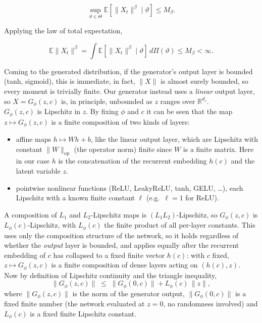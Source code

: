 \begin{appendices}
\[
\sup_{\vartheta\in\Theta}
\mathbb E
\left[
\|X_t\|^\beta
\mid
\vartheta
\right]
\le
M_\beta.
\]

Applying the law of total expectation,

\[
\mathbb E
\|X_t\|^\beta
=
\int
\mathbb E
[
\|X_t\|^\beta
\mid
\vartheta
]
\,d\Pi(\vartheta)
\le
M_\beta
<
\infty.
\]


\vspace{3cm}
Coming to the generated distribution,
if the generator's output layer is bounded (tanh, sigmoid), this is immediate, in fact, $\|X\|$ is almost surely bounded, 
so every moment is trivially finite. 
Our generator instead uses a \emph{linear} output layer, 
so $X=G_\phi(z,c)$ is, in principle, 
unbounded as $z$ ranges over $\mathbb{R}^{d_z}$.\\
$G_\phi(z,c)$ is Lipschitz in $z$. By fixing $\phi$ and $c$ it can be seen that
the map $z\mapsto G_\phi(z,c)$ is a finite composition of two kinds of layers:
\begin{itemize}
\item affine maps $h\mapsto Wh+b$, like the linear output layer,
which are Lipschitz with constant $\|W\|_{\mathrm{op}}$ (the operator norm) finite since $W$ is a finite matrix. Here in our case $h$ is the concatenation of the recurrent embedding $h(c)$ and the latent variable $z$.
\item pointwise nonlinear functions (ReLU, LeakyReLU, tanh, GELU, \ldots), each Lipschitz with a known finite constant $\ell$ (e.g.\ $\ell=1$ for ReLU).
\end{itemize}
A composition of $L_1$ and 
$L_2$-Lipschitz maps is $(L_1L_2)$-Lipschitz, 
so $G_\phi(z,c)$ is $L_\phi(c)$-Lipschitz, 
with $L_\phi(c)$ the finite product of all per-layer 
constants. 
This uses only the composition structure of 
the network, so it holds regardless of whether the 
\emph{output} layer is bounded, and applies equally 
after the recurrent embedding of $c$ has collapsed to a 
fixed finite vector $h(c)$: with $c$ fixed, 
$z\mapsto G_\phi(z,c)$ is a finite composition 
of dense layers acting on $(h(c),z)$.\\

Now by definition of Lipschitz continuity and the 
triangle inequality,
\[
\|G_\phi(z,c)\| \;\le\; \|G_\phi(0,c)\| + L_\phi(c)\,\|z\|,
\]
where $\|G_\phi(z,c)\|$ is the norm of the generator output, $\|G_\phi(0,c)\|$ is a fixed finite 
number (the network evaluated at $z=0$, no randomness 
involved) and $L_\phi(c)$ is a fixed finite 
Lipschitz constant.\\


\end{appendices}
